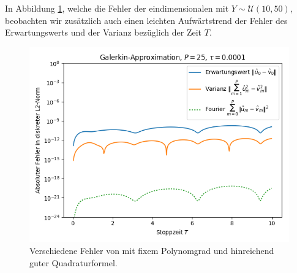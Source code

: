 \newline
In Abbildung \ref{fig:galerkin_bystoptime_trial3}, welche die Fehler der eindimensionalen  mit $Y\sim\mathcal{U}(10,50)$, beobachten wir zusätzlich auch einen leichten Aufwärtstrend der Fehler des Erwartungswerts und der Varianz bezüglich der Zeit $T$.
\begin{figure}[!htb]
\centering
\includegraphics[width=0.75\linewidth]{Figures/galerkin_bystoptime_trial3_fixeddegree25_big.png}
\caption{Verschiedene Fehler von  mit fixem Polynomgrad und hinreichend guter Quadraturformel.}
\label{fig:galerkin_bystoptime_trial3}
\end{figure}
